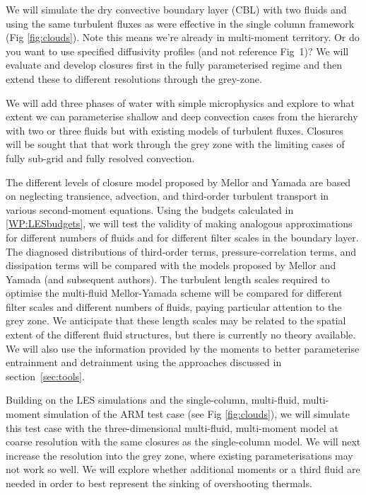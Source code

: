 \documentclass[11pt,a4paper]{article}
\begin{document}
We will simulate the dry convective boundary layer (CBL) with two fluids and using the same turbulent fluxes as were effective in the single column framework (Fig \ref{fig:clouds}). {\color{red} Note this means we're already in multi-moment territory. Or do you want to use specified diffusivity profiles (and not reference Fig~1)?} We will evaluate and develop closures first in the fully parameterised regime and then extend these to different resolutions through the grey-zone.


We will add three phases of water with simple microphysics and explore to what extent we can parameterise shallow and deep convection cases from the hierarchy with two or three fluids but with existing models of turbulent fluxes. Closures will be sought that that work through the grey zone with the limiting cases of fully sub-grid and fully resolved convection.


The different levels of closure model proposed by Mellor and Yamada are based on neglecting transience, advection, and third-order turbulent transport in various second-moment equations. Using the budgets calculated in \ref{WP:LESbudgets}, we will test the validity of making analogous approximations for different numbers of fluids and for different filter scales in the boundary layer. The diagnosed distributions of third-order terms, pressure-correlation terms, and dissipation terms will be compared with the models proposed by Mellor and Yamada (and subsequent authors). The turbulent length scales required to optimise the multi-fluid Mellor-Yamada scheme will be compared for different filter scales and different numbers of fluids, paying particular attention to the grey zone. We anticipate that these length scales {\color{green} may be related to the spatial extent of the different fluid structures}, but there is currently no theory available. We will also use the information provided by the moments to better parameterise entrainment and detrainment using the approaches discussed in section~\ref{sec:tools}.



Building on the LES simulations and the single-column, multi-fluid, multi-moment simulation of the ARM test case (see Fig \ref{fig:clouds}), we will simulate this test case with the three-dimensional multi-fluid, multi-moment model at coarse resolution with the same closures as the single-column model.  We will next increase the resolution into the grey zone, where existing parameterisations may not work so well. We will explore whether additional moments or a third fluid are needed in order to best represent the sinking of overshooting thermals. 
\end{document}
